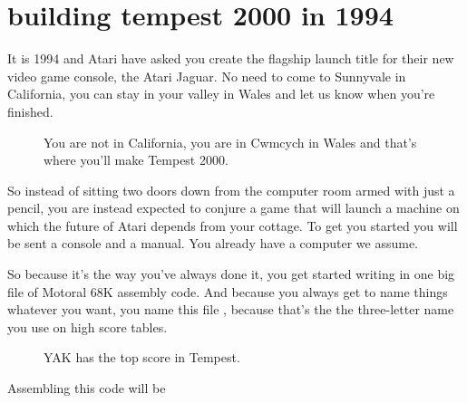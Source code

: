 \chapter{building tempest 2000 in 1994}
\label{sec:building_t2k}
\lstset{style=68KStyle}
\lhead[tempest 2000]{}

It is 1994 and Atari have asked you create the flagship launch title for their new video game console,
the Atari Jaguar. No need to come to Sunnyvale in California, you can stay in your valley in Wales and
let us know when you're finished.

\begin{figure}[H]
      \centering
    \caption{You are not in California, you are in Cwmcych in Wales and that's where you'll make Tempest 2000.}
\end{figure}

So instead of sitting two doors down from the computer room armed with just a pencil, you are instead 
expected to conjure a game that will launch a machine on which the future of Atari depends from your cottage.
To get you started you will be sent a console and a manual. You already have a computer we assume.

So because it's the way you've always done it, you get started writing  in one big file
of Motoral 68K assembly code.
And because you always get to name things whatever you want, you name this file , because that's the 
the three-letter name you use on high score tables.

\begin{figure}[H]
      \centering
    \caption{YAK has the top score in Tempest.}
\end{figure}

Assembling this code will be 
